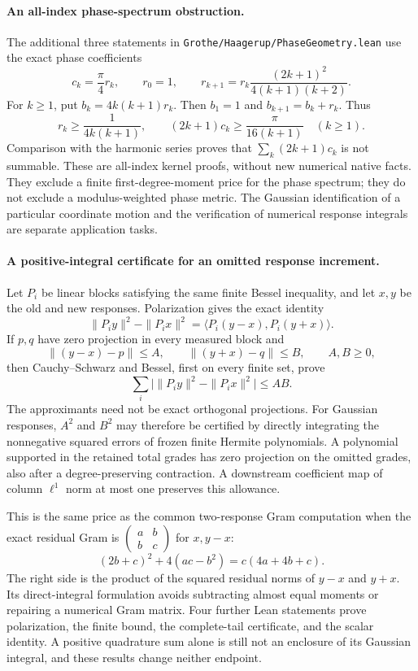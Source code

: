 \paragraph{An all-index phase-spectrum obstruction.}
The additional three statements in
\texttt{Grothe/Haagerup/}\allowbreak\texttt{PhaseGeometry.lean}
use the exact phase coefficients
\[
 c_k=\frac\pi4r_k,\qquad r_0=1,\qquad
 r_{k+1}=r_k\frac{(2k+1)^2}{4(k+1)(k+2)}.
\]
For $k\ge1$, put $b_k=4k(k+1)r_k$. Then $b_1=1$ and
$b_{k+1}=b_k+r_k$. Thus
\[
 r_k\ge\frac1{4k(k+1)},\qquad
 (2k+1)c_k\ge\frac\pi{16(k+1)}\quad(k\ge1).
\]
Comparison with the harmonic series proves that
$\sum_k(2k+1)c_k$ is not summable. These are all-index kernel proofs, without
new numerical native facts. They exclude a finite first-degree-moment price
for the phase spectrum; they do not exclude a modulus-weighted phase metric.
The Gaussian identification of a particular coordinate motion and the
verification of numerical response integrals are separate application tasks.

\paragraph{A positive-integral certificate for an omitted response increment.}
Let $P_i$ be linear blocks satisfying the same finite Bessel inequality, and
let $x,y$ be the old and new responses. Polarization gives the exact identity
\[
 \|P_i y\|^2-\|P_i x\|^2
 =\langle P_i(y-x),P_i(y+x)\rangle.
\]
If $p,q$ have zero projection in every measured block and
\[
 \|(y-x)-p\|\le A,\qquad \|(y+x)-q\|\le B,\qquad A,B\ge0,
\]
then Cauchy--Schwarz and Bessel, first on every finite set, prove
\[
 \boxed{\displaystyle
 \sum_i\big|\|P_i y\|^2-\|P_i x\|^2\big|\le AB.}
\]
The approximants need not be exact orthogonal projections. For Gaussian
responses, $A^2$ and $B^2$ may therefore be certified by directly integrating
the nonnegative squared errors of frozen finite Hermite polynomials. A
polynomial supported in the retained total grades has zero projection on
the omitted grades, also after a degree-preserving contraction. A downstream
coefficient map of column $\ell^1$ norm at most one preserves this allowance.

This is the same price as the common two-response Gram computation when
the exact residual Gram is
$\left(\begin{smallmatrix}a&b\\b&c\end{smallmatrix}\right)$ for $x,y-x$:
\[
 (2b+c)^2+4(ac-b^2)=c(4a+4b+c).
\]
The right side is the product of the squared residual norms of $y-x$ and
$y+x$. Its direct-integral formulation avoids subtracting almost equal
moments or repairing a numerical Gram matrix. Four further Lean statements
prove polarization, the finite bound, the complete-tail certificate, and the
scalar identity. A positive quadrature sum alone is still not an enclosure
of its Gaussian integral, and these results change neither endpoint.

